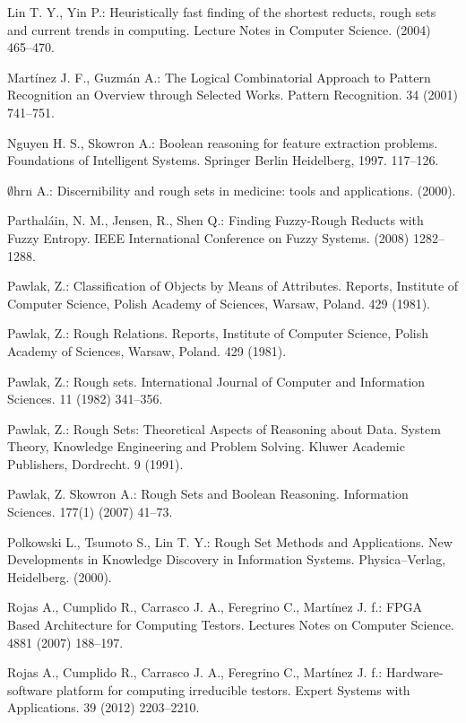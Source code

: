 \documentclass[11pt]{article}   %
\begin{document}
\begin{thebibliography}{}
	 Lin T. Y., Yin P.:
	 Heuristically fast finding of the shortest reducts, rough sets and current trends in computing.
	 Lecture Notes in Computer Science. (2004) 465--470.
	
	Mart\'inez J. F., Guzm\'an A.:
	The Logical Combinatorial Approach to Pattern Recognition an Overview through Selected Works. 
	Pattern Recognition. 34 (2001) 741--751.

	Nguyen H. S., Skowron A.:
	Boolean reasoning for feature extraction problems.
	Foundations of Intelligent Systems. Springer Berlin Heidelberg, 1997. 117--126.	
	
	$\emptyset$hrn A.:
	Discernibility and rough sets in medicine: tools and applications. (2000).	
	 
	Parthaláin, N. M., Jensen, R., Shen Q.:
	Finding Fuzzy-Rough Reducts with Fuzzy Entropy.
	IEEE International Conference on Fuzzy Systems. (2008) 1282--1288.
	
	Pawlak, Z.: 
	Classification of Objects by Means of Attributes.
	Reports, Institute of Computer Science, Polish Academy of Sciences, Warsaw, Poland. 429 (1981).

	Pawlak, Z.:
	Rough Relations.
	Reports, Institute of Computer Science, Polish Academy of Sciences, Warsaw, Poland. 429 (1981).

	Pawlak, Z.: 
	Rough sets.
	International Journal of Computer and Information Sciences. 11 (1982) 341--356.

	Pawlak, Z.: 
	Rough Sets: Theoretical Aspects of Reasoning about Data.
	System Theory, Knowledge Engineering and Problem Solving. 
	Kluwer Academic Publishers, Dordrecht. 9 (1991).
	
	Pawlak, Z. Skowron A.: 
	Rough Sets and Boolean Reasoning.
	Information Sciences. 177(1) (2007) 41--73.
	
	Polkowski L., Tsumoto S., Lin T. Y.: 
	Rough Set Methods and Applications. 
	New Developments in Knowledge Discovery in Information Systems.
	Physica–Verlag, Heidelberg. (2000).

	Rojas A., Cumplido R., Carrasco J. A., Feregrino C., Mart\'inez J. f.:
	FPGA Based Architecture for Computing Testors. 
	Lectures Notes on Computer Science. 4881 (2007) 188--197.

	Rojas A., Cumplido R., Carrasco J. A., Feregrino C., Mart\'inez J. f.:
	Hardware-software platform for computing irreducible testors. 
	Expert Systems with Applications. 39 (2012) 2203--2210.


\end{thebibliography}
\end{document}
